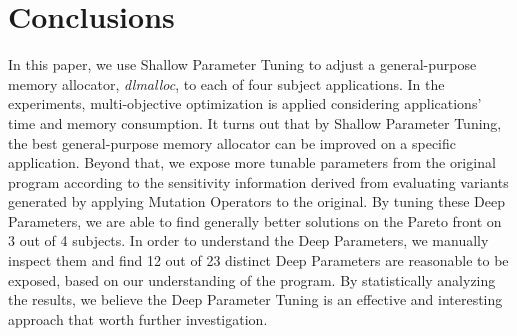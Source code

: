 \section{Conclusions}
In this paper, we use Shallow Parameter Tuning to adjust a general-purpose memory allocator, \emph{dlmalloc}, to each of four subject applications. In the experiments, multi-objective optimization is applied considering applications' time and memory consumption. It turns out that by Shallow Parameter Tuning, the best general-purpose memory allocator can be improved on a specific application. Beyond that, we expose more tunable parameters from the original program according to the sensitivity information derived from evaluating variants generated by applying Mutation Operators to the original. By tuning these Deep Parameters, we are able to find generally better solutions on the Pareto front on 3 out of 4 subjects. In order to understand the Deep Parameters, we manually inspect them and find 12 out of 23 distinct Deep Parameters are reasonable to be exposed, based on our understanding of the program. By statistically analyzing the results, we believe the Deep Parameter Tuning is an effective and interesting approach that worth further investigation.
